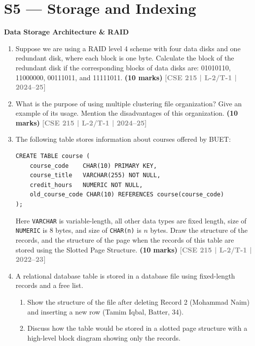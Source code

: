 \documentclass[12pt,a3paper]{article}
\newcommand{\yr}[1]{\hfill\textcolor{gray}{\small\textbf{[#1]}}}
\newcommand{\mk}[1]{\textcolor{orange!70!black}{\small\textbf{(#1 marks)}}}
\newcommand{\subtopic}[2]{%
  \vspace{10pt}
  \noindent\begin{tcolorbox}[colback=#1!8,colframe=#1,boxrule=0.6pt,arc=4pt,
    left=6pt,right=6pt,top=4pt,bottom=4pt]
    \small\bfseries\textcolor{#1}{#2}
  \end{tcolorbox}
  \vspace{2pt}
}
\begin{document}
\section{S5 --- Storage and Indexing}
\label{sec:S5}

\subtopic{cD}{Data Storage Architecture \& RAID}
\label{sub:s5-storage}

\begin{enumerate}

\item Suppose we are using a RAID level 4 scheme with four data disks and one redundant disk, where each block is one byte. Calculate the block of the redundant disk if the corresponding blocks of data disks are: 01010110, 11000000, 00111011, and 11111011.
\mk{10} \yr{CSE 215 | L-2/T-1 | 2024--25}

\item What is the purpose of using multiple clustering file organization? Give an example of its usage. Mention the disadvantages of this organization.
\mk{10} \yr{CSE 215 | L-2/T-1 | 2024--25}

\item The following table stores information about courses offered by BUET:
\begin{lstlisting}
CREATE TABLE course (
    course_code    CHAR(10) PRIMARY KEY,
    course_title   VARCHAR(255) NOT NULL,
    credit_hours   NUMERIC NOT NULL,
    old_course_code CHAR(10) REFERENCES course(course_code)
);
\end{lstlisting}
Here \texttt{VARCHAR} is variable-length, all other data types are fixed length, size of \texttt{NUMERIC} is 8 bytes, and size of \texttt{CHAR(n)} is $n$ bytes. Draw the structure of the records, and the structure of the page when the records of this table are stored using the Slotted Page Structure.
 \mk{10} \yr{CSE 215 | L-2/T-1 | 2022--23}

\item A relational database table is stored in a database file using fixed-length records and a free list.
\begin{enumerate}
  \item Show the structure of the file after deleting Record 2 (Mohammad Naim) and inserting a new row (Tamim Iqbal, Batter, 34).
  \item Discuss how the table would be stored in a slotted page structure with a high-level block diagram showing only the records.
\end{enumerate}


\end{enumerate}
\end{document}
